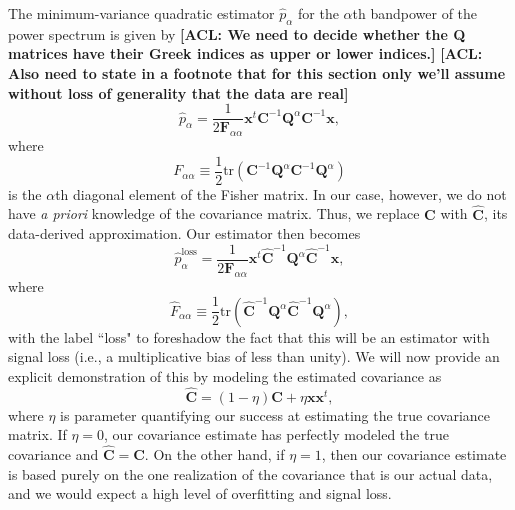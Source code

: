 \documentclass[preprint2,numberedappendix,tighten]{aastex6}  %
\newcommand{\x}{\mathbf{x}}
\newcommand{\C}{\mathbf{C}}
\newcommand{\Chat}{\mathbf{\hat{C}}}
\newcommand{\F}{\mathbf{F}}
\newcommand{\Q}{\mathbf{Q}}
\newcommand{\acl}[1]{{\color{red} \textbf{[ACL:  #1]}}}
\begin{document}
The minimum-variance quadratic estimator $\hat{p}_\alpha$ for the $\alpha$th bandpower of the power spectrum is given by \acl{We need to decide whether the Q matrices have their Greek indices as upper or lower indices.} \acl{Also need to state in a footnote that for this section only we'll assume without loss of generality that the data are real}
\begin{equation}
\hat{p}_\alpha = \frac{1} {2 \F_{\alpha \alpha} }\x^t \C^{-1} \Q^{\alpha} \C^{-1} \x,
\end{equation}
where
\begin{equation}
F_{\alpha \alpha} \equiv \frac{1}{2} \textrm{tr} \left( \C^{-1} \Q^\alpha \C^{-1} \Q^\alpha \right)
\end{equation}
is the $\alpha$th diagonal element of the Fisher matrix. In our case, however, we do not have \emph{a priori} knowledge of the covariance matrix. Thus, we replace $\C$ with $\Chat$, its data-derived approximation. Our estimator then becomes
\begin{equation}
\label{eq:phatloss}
\hat{p}_\alpha^\textrm{loss} = \frac{1} {2 \F_{\alpha \alpha} }\x^t \Chat^{-1} \Q^{\alpha} \Chat^{-1} \x,
\end{equation}
where
\begin{equation}
\hat{F}_{\alpha \alpha} \equiv \frac{1}{2} \textrm{tr} \left( \Chat^{-1} \Q^\alpha \Chat^{-1} \Q^\alpha \right),
\end{equation}
with the label ``loss" to foreshadow the fact that this will be an estimator with signal loss (i.e., a multiplicative bias of less than unity). We will now provide an explicit demonstration of this by modeling the estimated covariance as
\begin{equation}
\label{eq:ChatDef}
\Chat = (1-\eta) \C + \eta \x \x^t,
\end{equation}
where $\eta$ is parameter quantifying our success at estimating the true covariance matrix. If $\eta = 0$, our covariance estimate has perfectly modeled the true covariance and $\Chat = \C$. On the other hand, if $\eta =1$, then our covariance estimate is based purely on the one realization of the covariance that is our actual data, and we would expect a high level of overfitting and signal loss.
\end{document}

